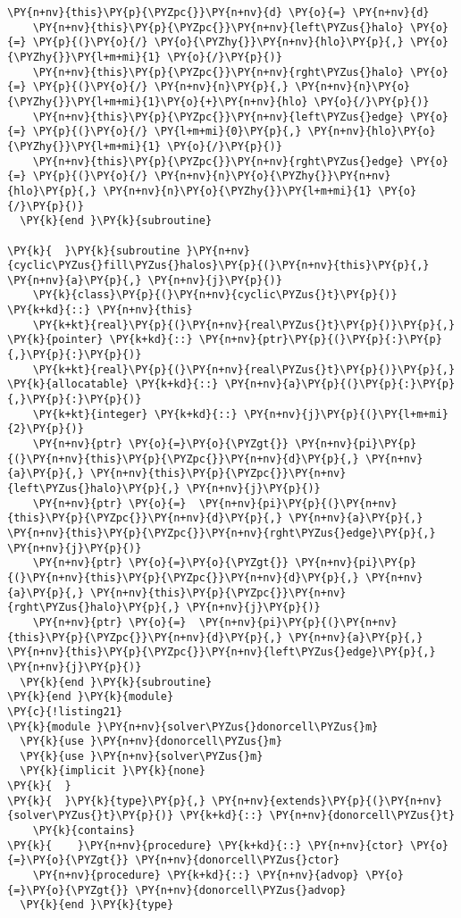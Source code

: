 \begin{Verbatim}[commandchars=\\\{\}]
    \PY{n+nv}{this}\PY{p}{\PYZpc{}}\PY{n+nv}{d} \PY{o}{=} \PY{n+nv}{d}
    \PY{n+nv}{this}\PY{p}{\PYZpc{}}\PY{n+nv}{left\PYZus{}halo} \PY{o}{=} \PY{p}{(}\PY{o}{/} \PY{o}{\PYZhy{}}\PY{n+nv}{hlo}\PY{p}{,} \PY{o}{\PYZhy{}}\PY{l+m+mi}{1} \PY{o}{/}\PY{p}{)} 
    \PY{n+nv}{this}\PY{p}{\PYZpc{}}\PY{n+nv}{rght\PYZus{}halo} \PY{o}{=} \PY{p}{(}\PY{o}{/} \PY{n+nv}{n}\PY{p}{,} \PY{n+nv}{n}\PY{o}{\PYZhy{}}\PY{l+m+mi}{1}\PY{o}{+}\PY{n+nv}{hlo} \PY{o}{/}\PY{p}{)} 
    \PY{n+nv}{this}\PY{p}{\PYZpc{}}\PY{n+nv}{left\PYZus{}edge} \PY{o}{=} \PY{p}{(}\PY{o}{/} \PY{l+m+mi}{0}\PY{p}{,} \PY{n+nv}{hlo}\PY{o}{\PYZhy{}}\PY{l+m+mi}{1} \PY{o}{/}\PY{p}{)}
    \PY{n+nv}{this}\PY{p}{\PYZpc{}}\PY{n+nv}{rght\PYZus{}edge} \PY{o}{=} \PY{p}{(}\PY{o}{/} \PY{n+nv}{n}\PY{o}{\PYZhy{}}\PY{n+nv}{hlo}\PY{p}{,} \PY{n+nv}{n}\PY{o}{\PYZhy{}}\PY{l+m+mi}{1} \PY{o}{/}\PY{p}{)}
  \PY{k}{end }\PY{k}{subroutine}

\PY{k}{  }\PY{k}{subroutine }\PY{n+nv}{cyclic\PYZus{}fill\PYZus{}halos}\PY{p}{(}\PY{n+nv}{this}\PY{p}{,} \PY{n+nv}{a}\PY{p}{,} \PY{n+nv}{j}\PY{p}{)}
    \PY{k}{class}\PY{p}{(}\PY{n+nv}{cyclic\PYZus{}t}\PY{p}{)} \PY{k+kd}{::} \PY{n+nv}{this}
    \PY{k+kt}{real}\PY{p}{(}\PY{n+nv}{real\PYZus{}t}\PY{p}{)}\PY{p}{,} \PY{k}{pointer} \PY{k+kd}{::} \PY{n+nv}{ptr}\PY{p}{(}\PY{p}{:}\PY{p}{,}\PY{p}{:}\PY{p}{)}
    \PY{k+kt}{real}\PY{p}{(}\PY{n+nv}{real\PYZus{}t}\PY{p}{)}\PY{p}{,} \PY{k}{allocatable} \PY{k+kd}{::} \PY{n+nv}{a}\PY{p}{(}\PY{p}{:}\PY{p}{,}\PY{p}{:}\PY{p}{)}
    \PY{k+kt}{integer} \PY{k+kd}{::} \PY{n+nv}{j}\PY{p}{(}\PY{l+m+mi}{2}\PY{p}{)}
    \PY{n+nv}{ptr} \PY{o}{=}\PY{o}{\PYZgt{}} \PY{n+nv}{pi}\PY{p}{(}\PY{n+nv}{this}\PY{p}{\PYZpc{}}\PY{n+nv}{d}\PY{p}{,} \PY{n+nv}{a}\PY{p}{,} \PY{n+nv}{this}\PY{p}{\PYZpc{}}\PY{n+nv}{left\PYZus{}halo}\PY{p}{,} \PY{n+nv}{j}\PY{p}{)} 
    \PY{n+nv}{ptr} \PY{o}{=}  \PY{n+nv}{pi}\PY{p}{(}\PY{n+nv}{this}\PY{p}{\PYZpc{}}\PY{n+nv}{d}\PY{p}{,} \PY{n+nv}{a}\PY{p}{,} \PY{n+nv}{this}\PY{p}{\PYZpc{}}\PY{n+nv}{rght\PYZus{}edge}\PY{p}{,} \PY{n+nv}{j}\PY{p}{)}
    \PY{n+nv}{ptr} \PY{o}{=}\PY{o}{\PYZgt{}} \PY{n+nv}{pi}\PY{p}{(}\PY{n+nv}{this}\PY{p}{\PYZpc{}}\PY{n+nv}{d}\PY{p}{,} \PY{n+nv}{a}\PY{p}{,} \PY{n+nv}{this}\PY{p}{\PYZpc{}}\PY{n+nv}{rght\PYZus{}halo}\PY{p}{,} \PY{n+nv}{j}\PY{p}{)} 
    \PY{n+nv}{ptr} \PY{o}{=}  \PY{n+nv}{pi}\PY{p}{(}\PY{n+nv}{this}\PY{p}{\PYZpc{}}\PY{n+nv}{d}\PY{p}{,} \PY{n+nv}{a}\PY{p}{,} \PY{n+nv}{this}\PY{p}{\PYZpc{}}\PY{n+nv}{left\PYZus{}edge}\PY{p}{,} \PY{n+nv}{j}\PY{p}{)}
  \PY{k}{end }\PY{k}{subroutine}
\PY{k}{end }\PY{k}{module}
\PY{c}{!listing21}
\PY{k}{module }\PY{n+nv}{solver\PYZus{}donorcell\PYZus{}m}
  \PY{k}{use }\PY{n+nv}{donorcell\PYZus{}m}
  \PY{k}{use }\PY{n+nv}{solver\PYZus{}m}
  \PY{k}{implicit }\PY{k}{none}
\PY{k}{  }
\PY{k}{  }\PY{k}{type}\PY{p}{,} \PY{n+nv}{extends}\PY{p}{(}\PY{n+nv}{solver\PYZus{}t}\PY{p}{)} \PY{k+kd}{::} \PY{n+nv}{donorcell\PYZus{}t}
    \PY{k}{contains}
\PY{k}{    }\PY{n+nv}{procedure} \PY{k+kd}{::} \PY{n+nv}{ctor} \PY{o}{=}\PY{o}{\PYZgt{}} \PY{n+nv}{donorcell\PYZus{}ctor}
    \PY{n+nv}{procedure} \PY{k+kd}{::} \PY{n+nv}{advop} \PY{o}{=}\PY{o}{\PYZgt{}} \PY{n+nv}{donorcell\PYZus{}advop}
  \PY{k}{end }\PY{k}{type}


\end{Verbatim}
